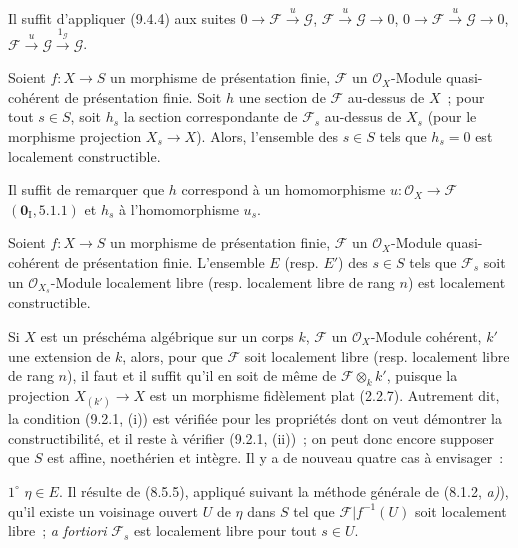 Il suffit d'appliquer (9.4.4) aux suites
$0\to\mathcal F\xrightarrow{u}\mathcal G$,
$\mathcal F\xrightarrow{u}\mathcal G\to0$,
$0\to\mathcal F\xrightarrow{u}\mathcal G\to0$,
$\mathcal F\xrightarrow{u}\mathcal G\xrightarrow{1_\mathcal G}\mathcal G$.

\begin{corollary}[9.4.6]
\label{IV.9.4.6-fr}
Soient $f:X\to S$ un morphisme de présentation finie, $\mathcal F$ un
$\mathcal O_X$-Module quasi-cohérent de présentation finie. Soit $h$ une
section de $\mathcal F$ au-dessus de $X$~; pour tout $s\in S$, soit $h_s$ la
section correspondante de $\mathcal F_s$ au-dessus de $X_s$ \textnormal{(}pour
le morphisme projection $X_s\to X$\textnormal{)}. Alors, l'ensemble des
$s\in S$ tels que $h_s=0$ est localement constructible.
\end{corollary}

Il suffit de remarquer que $h$ correspond à un homomorphisme
$u:\mathcal O_X\to\mathcal F$ $(\mathbf 0_{\mathrm I},5.1.1)$ et $h_s$ à
l'homomorphisme $u_s$.

\begin{proposition}[9.4.7]
\label{IV.9.4.7-fr}
Soient $f:X\to S$ un morphisme de présentation finie, $\mathcal F$ un
$\mathcal O_X$-Module quasi-cohérent de présentation finie. L'ensemble $E$
\textnormal{(resp.} $E'$\textnormal{)} des $s\in S$ tels que $\mathcal F_s$
soit un $\mathcal O_{X_s}$-Module localement libre \textnormal{(resp.}
localement libre de rang $n$\textnormal{)} est localement constructible.
\end{proposition}

Si $X$ est un préschéma algébrique sur un corps $k$, $\mathcal F$ un
$\mathcal O_X$-Module cohérent, $k'$ une extension de $k$, alors, pour que
$\mathcal F$ soit localement libre (resp. localement libre de rang $n$), il
faut et il suffit qu'il en soit de même de $\mathcal F\otimes_k k'$, puisque la
projection $X_{(k')}\to X$ est un morphisme fidèlement plat (2.2.7). Autrement
dit, la condition (9.2.1, (i)) est vérifiée pour les propriétés dont on veut
démontrer la constructibilité, et il reste à vérifier (9.2.1, (ii))~; on peut
donc encore supposer que $S$ est affine, noethérien et intègre. Il y a de
nouveau quatre cas à envisager~:

$1^\circ$ $\eta\in E$. Il résulte de (8.5.5), appliqué suivant la méthode
générale de (8.1.2, \emph{a)}), qu'il existe un voisinage ouvert $U$ de $\eta$
dans $S$ tel que $\mathcal F|f^{-1}(U)$ soit localement libre~;
\emph{a fortiori} $\mathcal F_s$ est localement libre pour tout $s\in U$.

